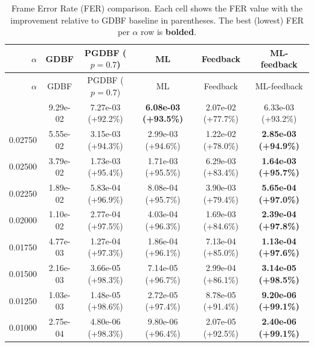 \setlength{\tabcolsep}{3.2pt}
\renewcommand{\arraystretch}{1.05}
\begin{center}
\scriptsize
\begin{longtable}{r c c c c c}
\caption{Frame Error Rate (FER) comparison. Each cell shows the FER value with the improvement relative to GDBF baseline in parentheses. The best (lowest) FER per $\alpha$ row is \textbf{bolded}.}\label{tab:fer-comparison}\\
\toprule
$\alpha$ & GDBF & PGDBF ($p=0.7$) & ML & Feedback & ML-feedback \\
\midrule
\endfirsthead
\toprule
$\alpha$ & GDBF & PGDBF ($p=0.7$) & ML & Feedback & ML-feedback \\
\midrule
\endhead
\bottomrule
\endfoot
0.03000 & 9.29e-02 & 7.27e-03 (+92.2\%) & \textbf{6.08e-03 (+93.5\%)} & 2.07e-02 (+77.7\%) & 6.33e-03 (+93.2\%) \\
0.02750 & 5.55e-02 & 3.15e-03 (+94.3\%) & 2.99e-03 (+94.6\%) & 1.22e-02 (+78.0\%) & \textbf{2.85e-03 (+94.9\%)} \\
0.02500 & 3.79e-02 & 1.73e-03 (+95.4\%) & 1.71e-03 (+95.5\%) & 6.29e-03 (+83.4\%) & \textbf{1.64e-03 (+95.7\%)} \\
0.02250 & 1.89e-02 & 5.83e-04 (+96.9\%) & 8.08e-04 (+95.7\%) & 3.90e-03 (+79.4\%) & \textbf{5.65e-04 (+97.0\%)} \\
0.02000 & 1.10e-02 & 2.77e-04 (+97.5\%) & 4.03e-04 (+96.3\%) & 1.69e-03 (+84.6\%) & \textbf{2.39e-04 (+97.8\%)} \\
0.01750 & 4.77e-03 & 1.27e-04 (+97.3\%) & 1.86e-04 (+96.1\%) & 7.13e-04 (+85.0\%) & \textbf{1.13e-04 (+97.6\%)} \\
0.01500 & 2.16e-03 & 3.66e-05 (+98.3\%) & 7.14e-05 (+96.7\%) & 2.99e-04 (+86.1\%) & \textbf{3.14e-05 (+98.5\%)} \\
0.01250 & 1.03e-03 & 1.48e-05 (+98.6\%) & 2.72e-05 (+97.4\%) & 8.78e-05 (+91.4\%) & \textbf{9.20e-06 (+99.1\%)} \\
0.01000 & 2.75e-04 & 4.80e-06 (+98.3\%) & 9.80e-06 (+96.4\%) & 2.07e-05 (+92.5\%) & \textbf{2.40e-06 (+99.1\%)} \\
\end{longtable}
\end{center}

